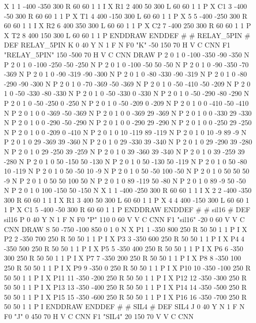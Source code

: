 X 1 1 -400 -350 300 R 60 60 1 1 I
X R1 2 400 50 300 L 60 60 1 1 P
X C1 3 -400 -50 300 R 60 60 1 1 P
X T1 4 400 -150 300 L 60 60 1 1 P
X 5 5 -400 -250 300 R 60 60 1 1 I
X R2 6 400 350 300 L 60 60 1 1 P
X C2 7 -400 250 300 R 60 60 1 1 P
X T2 8 400 150 300 L 60 60 1 1 P
ENDDRAW
ENDDEF
#
# RELAY_5PIN
#
DEF RELAY_5PIN K 0 40 Y N 1 F N
F0 "K" -50 150 70 H V C CNN
F1 "RELAY_5PIN" 150 -500 70 H V C CNN
DRAW
P 2 0 1 0  -100 -350  -90 -350 N
P 2 0 1 0  -100 -250  -50 -250 N
P 2 0 1 0  -100 -50  50 -50 N
P 2 0 1 0  -90 -350  -70 -369 N
P 2 0 1 0  -90 -319  -90 -300 N
P 2 0 1 0  -80 -330  -90 -319 N
P 2 0 1 0  -80 -290  -90 -300 N
P 2 0 1 0  -70 -369  -50 -369 N
P 2 0 1 0  -50 -410  -50 -209 N
P 2 0 1 0  -50 -330  -80 -330 N
P 2 0 1 0  -50 -330  0 -330 N
P 2 0 1 0  -50 -290  -80 -290 N
P 2 0 1 0  -50 -250  0 -250 N
P 2 0 1 0  -50 -209  0 -209 N
P 2 0 1 0  0 -410  -50 -410 N
P 2 0 1 0  0 -369  -50 -369 N
P 2 0 1 0  0 -369  29 -369 N
P 2 0 1 0  0 -330  29 -330 N
P 2 0 1 0  0 -290  -50 -290 N
P 2 0 1 0  0 -290  29 -290 N
P 2 0 1 0  0 -250  29 -250 N
P 2 0 1 0  0 -209  0 -410 N
P 2 0 1 0  10 -119  89 -119 N
P 2 0 1 0  10 -9  89 -9 N
P 2 0 1 0  29 -369  39 -360 N
P 2 0 1 0  29 -330  39 -340 N
P 2 0 1 0  29 -290  39 -280 N
P 2 0 1 0  29 -250  39 -259 N
P 2 0 1 0  39 -360  39 -340 N
P 2 0 1 0  39 -259  39 -280 N
P 2 0 1 0  50 -150  50 -130 N
P 2 0 1 0  50 -130  50 -119 N
P 2 0 1 0  50 -80  10 -119 N
P 2 0 1 0  50 -50  10 -9 N
P 2 0 1 0  50 -50  100 -50 N
P 2 0 1 0  50 50  50 -9 N
P 2 0 1 0  50 50  100 50 N
P 2 0 1 0  89 -119  50 -80 N
P 2 0 1 0  89 -9  50 -50 N
P 2 0 1 0  100 -150  50 -150 N
X 1 1 -400 -250 300 R 60 60 1 1 I
X 2 2 -400 -350 300 R 60 60 1 1 I
X R1 3 400 50 300 L 60 60 1 1 P
X 4 4 400 -150 300 L 60 60 1 1 P
X C1 5 -400 -50 300 R 60 60 1 1 P
ENDDRAW
ENDDEF
#
# sil16
#
DEF sil16 P 0 40 Y N 1 F N
F0 "P" 110 0 60 V V C CNN
F1 "sil16" -20 0 60 V V C CNN
DRAW
S 50 -750 -100 850 0 1 0 N
X P1 1 -350 800 250 R 50 50 1 1 P I
X P2 2 -350 700 250 R 50 50 1 1 P I
X P3 3 -350 600 250 R 50 50 1 1 P I
X P4 4 -350 500 250 R 50 50 1 1 P I
X P5 5 -350 400 250 R 50 50 1 1 P I
X P6 6 -350 300 250 R 50 50 1 1 P I
X P7 7 -350 200 250 R 50 50 1 1 P I
X P8 8 -350 100 250 R 50 50 1 1 P I
X P9 9 -350 0 250 R 50 50 1 1 P I
X P10 10 -350 -100 250 R 50 50 1 1 P I
X P11 11 -350 -200 250 R 50 50 1 1 P I
X P12 12 -350 -300 250 R 50 50 1 1 P I
X P13 13 -350 -400 250 R 50 50 1 1 P I
X P14 14 -350 -500 250 R 50 50 1 1 P I
X P15 15 -350 -600 250 R 50 50 1 1 P I
X P16 16 -350 -700 250 R 50 50 1 1 P I
ENDDRAW
ENDDEF
#
# SIL4
#
DEF SIL4 J 0 40 Y N 1 F N
F0 "J" 0 450 70 H V C CNN
F1 "SIL4" 20 150 70 V V C CNN
